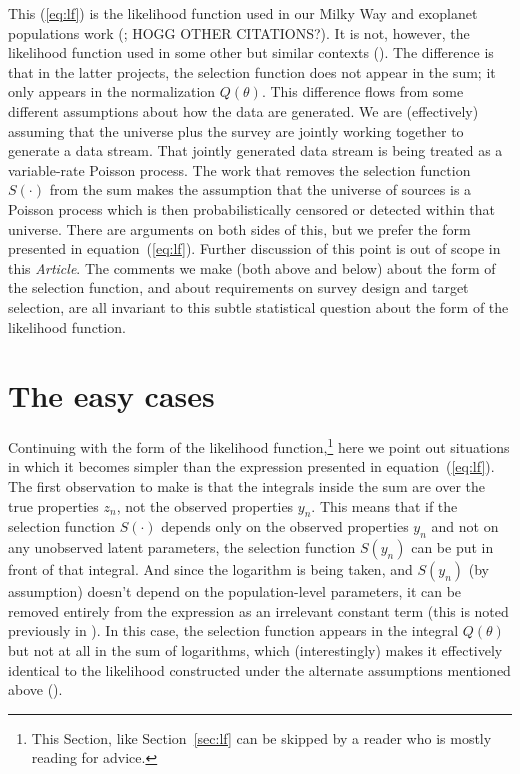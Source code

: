 \documentclass[modern]{aastex62}
\newcommand{\documentname}{\textsl{Article}}
\newcommand{\sectionname}{Section}
\newcommand{\equationname}{equation}
\begin{document}
This (\ref{eq:lf}) is the likelihood function used in our Milky Way
and exoplanet populations work (\citealt{bovy, exopop}; HOGG OTHER
CITATIONS?).
It is not, however, the likelihood function used in some other but
similar contexts (\citealt{loredogrb, loredo}).
The difference is that in the latter projects, the selection function
does not appear in the sum; it only appears in the normalization $Q(\theta)$.
This difference flows from some different assumptions about how the
data are generated.
We are (effectively) assuming that the universe plus the survey are jointly
working together to generate a data stream.
That jointly generated data stream is being treated as a variable-rate Poisson
process.
The work that removes the selection function $S(\cdot)$ from the sum
makes the assumption that the universe of sources is a Poisson process
which is then probabilistically censored or detected within that universe.
There are arguments on both sides of this, but we prefer the form
presented in \equationname~(\ref{eq:lf}).
Further discussion of this point is out of scope in this \documentname.
The comments we make (both above and below) about the form of the
selection function, and about requirements on survey design and target
selection, are all invariant to this subtle statistical question about
the form of the likelihood function.

\section{The easy cases}\label{sec:easy}

Continuing with the form of the likelihood function,\footnote{This
  \sectionname, like \sectionname~\ref{sec:lf} can be skipped by a
  reader who is mostly reading for advice.} here we point out
situations in which it becomes simpler than the expression presented
in equation~(\ref{eq:lf}).
The first observation to make is that the integrals inside the sum are
over the true properties $z_n$, not the observed properties $y_n$.
This means that if the selection function $S(\cdot)$ depends only on
the observed properties $y_n$ and not on any unobserved latent parameters,
the selection function $S(y_n)$ can be put in front of that integral.
And since the logarithm is being taken, and $S(y_n)$ (by assumption)
doesn't depend on the population-level parameters, it can be removed
entirely from the expression as an irrelevant constant term (this is
noted previously in \citealt{bovy}).
In this case, the selection function appears in the integral
$Q(\theta)$ but not at all in the sum of logarithms, which
(interestingly) makes it effectively identical to the likelihood
constructed under the alternate assumptions mentioned above
(\citealt{loredo}).
\end{document}

